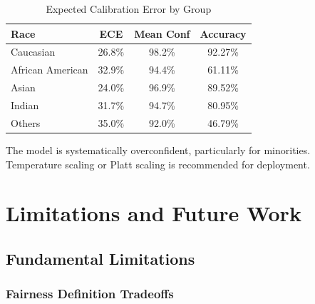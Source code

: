 \documentclass[11pt,a4paper,oneside]{report}
\begin{document}
\begin{table}[h]

\centering

\caption{Expected Calibration Error by Group}

\begin{tabular}{|l|c|c|c|}

\hline

\textbf{Race} & \textbf{ECE} & \textbf{Mean Conf} & \textbf{Accuracy} \\

\hline

Caucasian & 26.8\% & 98.2\% & 92.27\% \\

\hline

African American & 32.9\% & 94.4\% & 61.11\% \\

\hline

Asian & 24.0\% & 96.9\% & 89.52\% \\

\hline

Indian & 31.7\% & 94.7\% & 80.95\% \\

\hline

Others & 35.0\% & 92.0\% & 46.79\% \\

\hline

\end{tabular}

\end{table}

The model is systematically overconfident, particularly for minorities. Temperature scaling or Platt scaling is recommended for deployment.


\chapter{Limitations and Future Work}

\section{Fundamental Limitations}

\subsection{Fairness Definition Tradeoffs}
\end{document}
